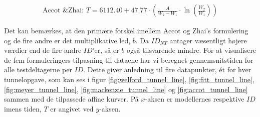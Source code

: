 \begin{align*}
\text{Accot \& Zhai: } T = 6112.40+47.77 \cdot \left(\frac{A}{W_2-W_1}\cdot\ln\left(\frac{W_2}{W_1 }\right)\right)
\end{align*}

Det kan bemærkes, at den primære forskel imellem Accot og Zhai's formulering og de fire andre er det multiplikative led, $b$. Da $ID_{NT}$ antager væsentligt højere værdier end de fire andre $ID$'er, så er $b$ også tilsvarende mindre. For at visualisere de fem formuleringers tilpasning til dataene har vi beregnet gennemsnitstiden for alle testdeltagerne per $ID$. Dette giver anledning til fire datapunkter, ét for hver tunnelopgave, som kan ses i figur \ref{fig:welford_tunnel_line}, \ref{fig:fitt_tunnel_line}, \ref{fig:meyer_tunnel_line}, \ref{fig:mackenzie_tunnel_line} og \ref{fig:accot_tunnel_line} sammen med de tilpassede affine kurver. På $x$-aksen er modellernes respektive $ID$ imens tiden, $T$ er angivet ved $y$-aksen. 

